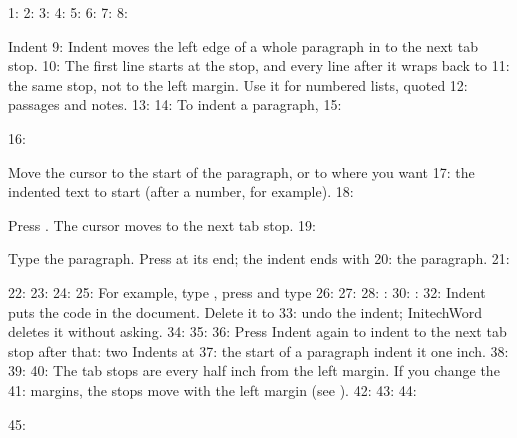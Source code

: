 1: %
2: %
3: %
4: %
5: %
6: %
7: 
8: \begin{Feature}{Indent}
9: Indent moves the left edge of a whole paragraph in to the next tab stop.
10: The first line starts at the stop, and every line after it wraps back to
11: the same stop, not to the left margin.  Use it for numbered lists, quoted
12: passages and notes.
13: 
14: To indent a paragraph,
15: \begin{WPSteps}
16: \item Move the cursor to the start of the paragraph, or to where you want
17: the indented text to start (after a number, for example).
18: \item Press .  The cursor moves to the next tab stop.
19: \item Type the paragraph.  Press  at its end; the indent ends with
20: the paragraph.
21: \end{WPSteps}
22: 
23: 
24: 
25: For example, type , press  and type
26: 
27: 
28: : 
30: : 
32: Indent puts the code  in the document.  Delete it to
33: undo the indent; InitechWord deletes it without asking.
34: 
35: 
36: Press Indent again to indent to the next tab stop after that: two Indents at
37: the start of a paragraph indent it one inch.
38: 
39: 
40: The tab stops are every half inch from the left margin.  If you change the
41: margins, the stops move with the left margin (see ).
42: 
43: 
44: \end{Feature}
45: 
